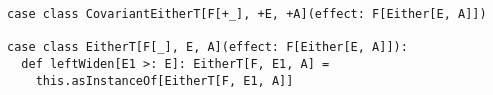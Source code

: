 \begin{algorithm}

\begin{verbatim}
case class CovariantEitherT[F[+_], +E, +A](effect: F[Either[E, A]])

case class EitherT[F[_], E, A](effect: F[Either[E, A]]):
  def leftWiden[E1 >: E]: EitherT[F, E1, A] =
    this.asInstanceOf[EitherT[F, E1, A]]
\end{verbatim}

\caption{EitherT leftWiden method. %
\label{monadtransformer:either-t-variance}}
\end{algorithm}